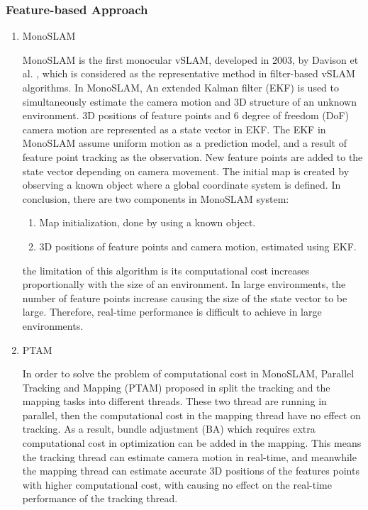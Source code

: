 \subsubsection{Feature-based Approach}
\begin{enumerate}[1.]
	\item MonoSLAM
	
	MonoSLAM is the first monocular vSLAM, developed in 2003, by Davison et al. \cite{davison2003real,davison2007monoslam}, which is considered as the representative method in filter-based vSLAM algorithms. In MonoSLAM, An extended Kalman filter (EKF) is used to simultaneously estimate the camera motion and 3D structure of an unknown environment. 3D positions of feature points and 6 degree of freedom (DoF) camera motion are represented as a state vector in EKF. The EKF in MonoSLAM assume uniform motion as a prediction model, and a result of feature point tracking as the observation. New feature points are added to the state vector depending on camera movement. The initial map is created by observing a known object where a global coordinate system is defined. In conclusion, there are two components in MonoSLAM system:
	\begin{enumerate}
		\item Map initialization, done by using a known object.
		\item 3D positions of feature points and camera motion, estimated using EKF.
	\end{enumerate}
	the limitation of this algorithm is its computational cost increases proportionally with the size of an environment. In large environments, the number of feature points increase causing the size of the state vector to be large. Therefore, real-time performance is difficult to achieve in large environments.

	\item PTAM
	
	In order to solve the problem of computational cost in MonoSLAM, Parallel Tracking and Mapping (PTAM) proposed in \cite{klein2007parallel} split the tracking and the mapping tasks into different threads. These two thread are running in parallel, then the computational cost in the mapping thread have no effect on tracking. As a result, bundle adjustment (BA) which requires extra computational cost in optimization can be added in the mapping. This means the tracking thread can estimate camera motion in real-time, and meanwhile the mapping thread can estimate accurate 3D positions of the features points with higher computational cost, with causing no effect on the real-time performance of the tracking thread.
	

\end{enumerate}
